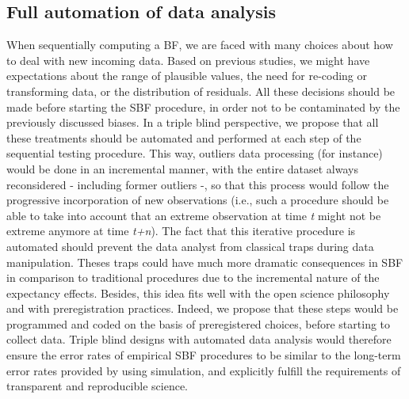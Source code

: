 \documentclass[a4paper,man,natbib,floatsintext,donotrepeattitle]{apa6}
\begin{document}
\subsection{Full automation of data analysis}

When sequentially computing a BF, we are faced with many choices about how to deal with new incoming data. Based on previous studies, we might have expectations about the range of plausible values, the need for re-coding or transforming data, or the distribution of residuals. All these decisions should be made before starting the SBF procedure, in order not to be contaminated by the previously discussed biases. In a triple blind perspective, we propose that all these treatments should be automated and performed at each step of the sequential testing procedure. This way, outliers data processing (for instance) would be done in an incremental manner, with the entire dataset always reconsidered - including former outliers -, so that this process would follow the progressive incorporation of new observations (i.e., such a procedure should be able to take into account that an extreme observation at time \textit{t} might not be extreme anymore at time \textit{t+n}). The fact that this iterative procedure is automated should prevent the data analyst from classical traps during data manipulation. Theses traps could have much more dramatic consequences in SBF in comparison to traditional procedures due to the incremental nature of the expectancy effects. Besides, this idea fits well with the open science philosophy and with preregistration practices. Indeed, we propose that these steps would be programmed and coded on the basis of preregistered choices, before starting to collect data. Triple blind designs with automated data analysis would therefore ensure the error rates of empirical SBF procedures to be similar to the long-term error rates provided by \cite{schonbrodt_sequential_2017} using simulation, and explicitly fulfill the requirements of transparent and reproducible science. \par

\end{document}
